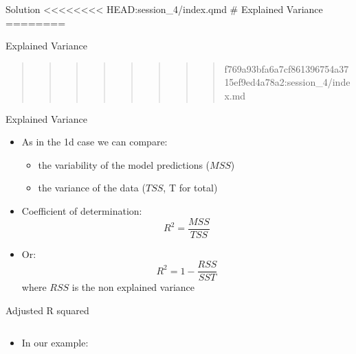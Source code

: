 \documentclass[
  ignorenonframetext,
  aspectratio=169,
]{beamer}
\providecommand{\tightlist}{%
  \setlength{\itemsep}{0pt}\setlength{\parskip}{0pt}}\usepackage{longtable,booktabs,array}
\begin{document}
\begin{frame}[fragile]
\begin{block}{Solution}
\textless\textless\textless\textless\textless\textless\textless\textless{}
HEAD:session\_4/index.qmd \# Explained Variance ========
\end{block}
\end{frame}

\begin{frame}{Explained Variance}
\protect\hypertarget{explained-variance}{}
\end{frame}

\begin{frame}
\begin{quote}
\begin{quote}
\begin{quote}
\begin{quote}
\begin{quote}
\begin{quote}
\begin{quote}
\begin{quote}
f769a93bfa6a7cf861396754a3715ef9ed4a78a2:session\_4/index.md
\end{quote}
\end{quote}
\end{quote}
\end{quote}
\end{quote}
\end{quote}
\end{quote}
\end{quote}

\begin{block}{Explained Variance}
\protect\hypertarget{explained-variance-1}{}
\begin{itemize}
\tightlist
\item
  As in the 1d case we can compare:

  \begin{itemize}
  \tightlist
  \item
    the variability of the model predictions (\(MSS\))
  \item
    the variance of the data (\(TSS\), T for total)
  \end{itemize}
\item
  Coefficient of determination: \[R^2 = \frac{MSS}{TSS}\]
\item
  Or: \[R^2 = 1-\frac{RSS}{SST}\] where \(RSS\) is the non explained
  variance
\end{itemize}
\end{block}

\begin{block}{Adjusted R squared}
\protect\hypertarget{adjusted-r-squared}{}
\begin{columns}[T]
\begin{column}{0.48\textwidth}
\begin{itemize}
\tightlist
\item
  In our example:
\end{itemize}


\end{column}
\end{columns}
\end{block}
\end{frame}
\end{document}
